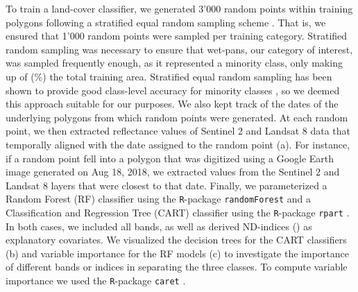 \documentclass[abstract=on,10pt,a4paper,bibliography=totocnumbered]{article}
\newcommand{\inputy}[1]{\unskip}
\begin{document}
To train a land-cover classifier, we generated 3'000 random points within
training polygons following a stratified equal random sampling scheme
\citep{Shetty.2021}. That is, we ensured that 1'000 random points were sampled
per training category. Stratified random sampling was necessary to ensure that
wet-pans, our category of interest, was sampled frequently enough, as it
represented a minority class, only making up of
(\inputy{GeneralMetrics/PercentageTrainingWetpan}\%) the total training area.
Stratified equal random sampling has been shown to provide good class-level
accuracy for minority classes \citep{Shetty.2021}, so we deemed this approach
suitable for our purposes. We also kept track of the dates of the underlying
polygons from which random points were generated. At each random point, we then
extracted reflectance values of Sentinel 2 and Landsat 8 data that temporally
aligned with the date assigned to the random point (a). For
instance, if a random point fell into a polygon that was digitized using a
Google Earth image generated on Aug 18, 2018, we extracted values from the
Sentinel 2 and Landsat 8 layers that were closest to that date. Finally, we
parameterized a Random Forest (RF) classifier using the \texttt{R}-package
\texttt{randomForest} \citep{Cutler.2024} and a Classification and Regression
Tree (CART) classifier using the \texttt{R}-package \texttt{rpart}
\citep{Therneau.2024b}. In both cases, we included all bands, as well as derived
ND-indices () as explanatory covariates. We visualized the decision
trees for the CART classifiers (b) and variable importance
for the RF models (c) to investigate the importance of
different bands or indices in separating the three classes. To compute variable
importance we used the \texttt{R}-package \texttt{caret} \citep{Kuhn.2008}.
\end{document}
